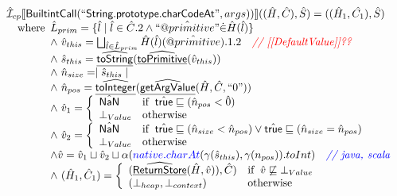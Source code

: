 \documentclass{article}
\makeatletter
\newcommand{\SF}[1]{\mbox{\textsf{#1}}}
\newcommand{\comment}[1]{\textit{#1}}
\newcommand{\wherec}[1]{{\rm where}\begin{array}[t]{l}#1\end{array}}
\newcommand{\ifc}[1]{{\rm if}\begin{array}[t]{l}#1\end{array}}
\newcommand{\owc}{{\rm otherwise}}
\newcommand{\aI}{\hat{\mathcal{I}}}
\newcommand{\lbr}{\llbracket}
\newcommand{\rbr}{\rrbracket}
\newcommand{\ahf}[1]{\widehat{\underline{\sf #1}}}
\newcommand{\avarprop}[1]{\hat{@#1}}
\newcommand{\atrue}{\hat{\SF{true}}}
\def\inred{\color{red}}
\def\inblue{\color{blue}}
\def\inred{\color{red}}
\def\inblue{\color{blue}}
\makeatother
\begin{document}
\[\begin{array}{l}
\aI _{cp}\lbr \SF{BuiltintCall}(``\SF{String.prototype.charCodeAt}",args))\rbr((\hat{H},\hat{C}), \hat{S})
  = ((\hat{H}_1, \hat{C_1}), \hat{S})\\
\quad\wherec{     
  \hat{L}_{prim} = \{ \hat{l} \mid \hat{l} \in \hat{C}.2 \land ``\avarprop{primitive}" \dot{\in}\hat{H}(\hat{l}) \}\\
  \land\ \hat{v}_{this} = \bigsqcup_{\hat{l} \in \hat{L}_{prim}} \hat{H}(\hat{l})(\avarprop{primitive}).1.2
    \quad\comment{{\inred // [[DefaultValue]]??}}\\
  \land\ \hat{s}_{this} = \ahf{toString}(\ahf{toPrimitive}(\hat{v}_{this}))\\
  \land\ \hat{n}_{size} = \mid \hat{s}_{this} \mid\\
  \land\ \hat{n}_{pos} = \ahf{toInteger}(\ahf{getArgValue}(\hat{H}, \hat{C}, ``0"))\\
  \land\ \hat{v}_1 =  \left\{\begin{array}{ll}
      \hat{\SF{NaN}} & \ifc{\atrue \sqsubseteq (\hat{n}_{pos} < \hat{0})}\\
      \bot_{Value} & \owc\\
    \end{array}\right.\\
  \land\ \hat{v}_2 =  \left\{\begin{array}{ll}
      \hat{\SF{NaN}}
      & \ifc{\atrue \sqsubseteq (\hat{n}_{size} < \hat{n}_{pos}) 
        \lor \atrue \sqsubseteq (\hat{n}_{size} = \hat{n}_{pos}) }\\
      \bot_{Value} & \owc\\
    \end{array}\right.\\
  \land \hat{v} = \hat{v}_1 \sqcup \hat{v}_2 \sqcup \alpha({\inblue native.charAt}(\gamma(\hat{s}_{this}),\gamma(n_{pos})).toInt)\quad\comment{{\inblue // java, scala}}\\  
  \land\ (\hat{H}_1, \hat{C}_1) = 
    \left\{\begin{array}{ll}
      (\ahf{ReturnStore}(\hat{H}, \hat{v})), \hat{C})
      & \ifc{\hat{v} \not\sqsubseteq \bot_{Value}}\\
      (\bot_{heap}, \bot_{context}) & \owc \\
    \end{array}\right.\\
  }\\
\\\\


\end{array}
\]
\end{document}
